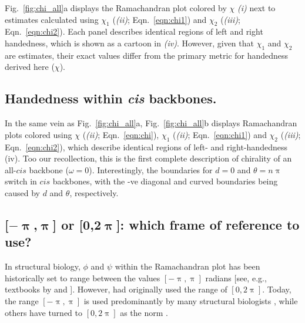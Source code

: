 \documentclass[fleqn,10pt]{wlpeerj} %
\newcommand{\Fig}[1]{Fig.~\ref{#1}}
\newcommand{\Eqn}[1]{Eqn.~\ref{#1}}
\begin{document}
\Fig{fig:chi_all}a displays the Ramachandran plot colored by $\chi$ \textit{(i)} next to estimates calculated using $\chi_1$ (\textit{(ii)}; \Eqn{eqn:chi1}) and $\chi_2$ (\textit{(iii)}; \Eqn{eqn:chi2}). Each panel describes identical regions of left and right handedness, which is shown as a cartoon in \textit{(iv)}. However, given that $\chi_1$ and $\chi_2$ are estimates, their exact values differ from the primary metric for handedness derived here ($\chi$).

\subsection*{Handedness within \textit{cis} backbones.}
In the same vein as \Fig{fig:chi_all}a, \Fig{fig:chi_all}b displays Ramachandran plots colored using $\chi$ (\textit{(ii)}; \Eqn{eqn:chi}), $\chi_1$ (\textit{(ii)}; \Eqn{eqn:chi1}) and $\chi_2$  (\textit{(iii)}; \Eqn{eqn:chi2}), which describe identical regions of left- and right-handedness {(iv)}. Too our recollection, this is the first complete description of chirality of an all-$cis$ backbone ($\omega=0$). Interestingly, the boundaries for $d=0$ and $\theta=n\uppi$ switch in $cis$ backbones, with the -ve diagonal and curved boundaries being caused by $d$ and $\theta$, respectively.

\subsection*{[$\bm{-\uppi}$,$\bm{\uppi}$] or [$\bm{0}$,$\bm{2\uppi}$]: which frame of reference to use?} 
In structural biology, $\phi$ and $\psi$ within the Ramachandran plot has been historically set to range between the values $[-\uppi,\uppi]$ radians [see, e.g., textbooks by \cite{Berg2006} and \cite{Alberts2002}]. However, \cite{Ramachandran1963} had originally used the range of $[0,2\uppi]$. Today, the range $[-\uppi,\uppi]$ is used predominantly by many structural biologists \citep{Laskowski1993,Laskowski2003,Zacharias2013}, while others have turned to $[0,2\uppi]$ as the norm \citep{Nemethy1966,Voelz2011}. 
\end{document}
